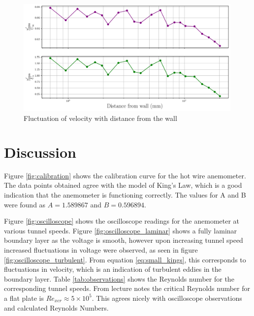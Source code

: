 \documentclass{article}
\begin{document}
\begin{figure}[H]
    \centering
    \includegraphics[width=0.99\textwidth]{u_fluctuation.png}
    \caption{Fluctuation of velocity with distance from the wall}
    \label{fig:fluctuation}
\end{figure}


\section{Discussion}



Figure \ref{fig:calibration} shows the calibration curve for the hot wire anemometer.
The data points obtained agree with the model of King's Law, which is a good indication that the anemometer is functioning correctly.
The values for A and B were found as $A	= 1.589867$ and $B	= 0.596894$.


Figure \ref{fig:oscilloscope} shows the oscilloscope readings for the anemometer at various tunnel speeds.
Figure \ref{fig:oscilloscope_laminar} shows a fully laminar boundary layer as the voltage is smooth, 
however upon increasing tunnel speed increased fluctuations in voltage were observed, as seen in figure \ref{fig:oscilloscope_turbulent}.
From equation \ref{eq:small_kings}, this corresponds to fluctuations in velocity, which is an indication of turbulent eddies in the boundary layer.
Table \ref{tab:observations} shows the Reynolds number for the corresponding tunnel speeds.
From lecture notes the critical Reynolds number for a flat plate is $Re_{xcr} \approx 5 \times 10^5$.
This agrees nicely with oscilloscope observations and calculated Reynolds Numbers.
\end{document}
